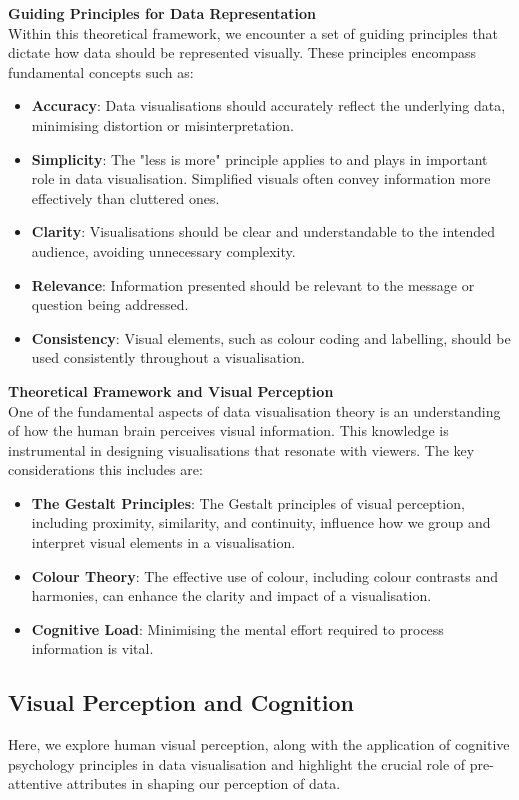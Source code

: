 \documentclass{article}\usepackage[]{graphicx}\usepackage[]{xcolor}
\begin{document}
\textbf{Guiding Principles for Data Representation}\\
Within this theoretical framework, we encounter a set of guiding principles that dictate how data should be represented visually. These principles encompass fundamental concepts such as:
\begin{itemize}
    \item \textbf{Accuracy}: Data visualisations should accurately reflect the underlying data, minimising distortion or misinterpretation.
    \item \textbf{Simplicity}: The "less is more" principle applies to and plays in important role in data visualisation. Simplified visuals often convey information more effectively than cluttered ones.
    \item \textbf{Clarity}: Visualisations should be clear and understandable to the intended audience, avoiding unnecessary complexity.
    \item \textbf{Relevance}: Information presented should be relevant to the message or question being addressed.
    \item \textbf{Consistency}: Visual elements, such as colour coding and labelling, should be used consistently throughout a visualisation.
\end{itemize}

\textbf{Theoretical Framework and Visual Perception}\\
One of the fundamental aspects of data visualisation theory is an understanding of how the human brain perceives visual information. This knowledge is instrumental in designing visualisations that resonate with viewers. The key considerations this includes are:
\begin{itemize}
    \item \textbf{The Gestalt Principles}: The Gestalt principles of visual perception, including proximity, similarity, and continuity, influence how we group and interpret visual elements in a visualisation.
    \item \textbf{Colour Theory}: The effective use of colour, including colour contrasts and harmonies, can enhance the clarity and impact of a visualisation.
    \item \textbf{Cognitive Load}: Minimising the mental effort required to process information is vital.
\end{itemize}

\subsection{Visual Perception and Cognition}
Here, we explore human visual perception, along with the application of cognitive psychology principles in data visualisation and highlight the crucial role of pre-attentive attributes in shaping our perception of data.\\ 
\end{document}
